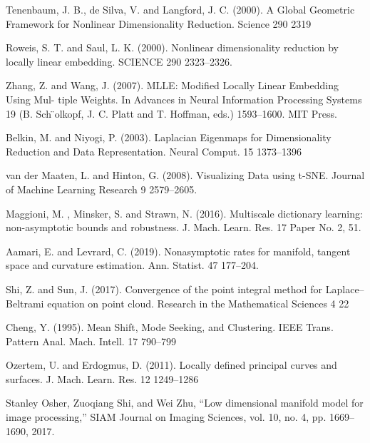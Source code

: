 \documentclass[tablecaption=bottom,wcp]{jmlr} %
\begin{document}
\begin{thebibliography}{99}
 Tenenbaum, J. B., de Silva, V. and Langford, J. C. (2000). A Global Geometric
Framework for Nonlinear Dimensionality Reduction. Science 290 2319

 Roweis, S. T.
and
Saul, L. K.
(2000). Nonlinear dimensionality reduction by locally
linear embedding.
SCIENCE
290
2323–2326.

 Zhang, Z.
and
Wang, J.
(2007). MLLE: Modified Locally Linear Embedding Using Mul-
tiple Weights. In
Advances in Neural Information Processing Systems 19
(B. Sch ̈olkopf,
J. C. Platt and T. Hoffman, eds.) 1593–1600. MIT Press.

 Belkin, M.
and
Niyogi, P.
(2003). Laplacian Eigenmaps for Dimensionality Reduction
and Data Representation.
Neural Comput.
15
1373–1396

 van der Maaten, L.
and
Hinton, G.
(2008). Visualizing Data using t-SNE.
Journal of
Machine Learning Research
9
2579–2605.

 Maggioni, M.
,
Minsker, S.
and
Strawn, N.
(2016). Multiscale dictionary learning:
non-asymptotic bounds and robustness.
J. Mach. Learn. Res.
17
Paper No. 2, 51.

 Aamari, E.
and
Levrard, C.
(2019). Nonasymptotic rates for manifold, tangent space
and curvature estimation.
Ann. Statist.
47
177–204.

 Shi, Z.
and
Sun, J.
(2017). Convergence of the point integral method for Laplace–Beltrami
equation on point cloud.
Research in the Mathematical Sciences
4
22

 Cheng, Y.
(1995). Mean Shift, Mode Seeking, and Clustering.
IEEE Trans. Pattern Anal.
Mach. Intell.
17
790–799

 Ozertem, U.
and
Erdogmus, D.
(2011). Locally defined principal curves and surfaces.
J. Mach. Learn. Res.
12
1249–1286


 Stanley Osher, Zuoqiang Shi, and Wei Zhu, “Low dimensional manifold model for image processing,” SIAM
Journal on Imaging Sciences, vol. 10, no. 4, pp. 1669–
1690, 2017.


\end{thebibliography}{}
\end{document}
